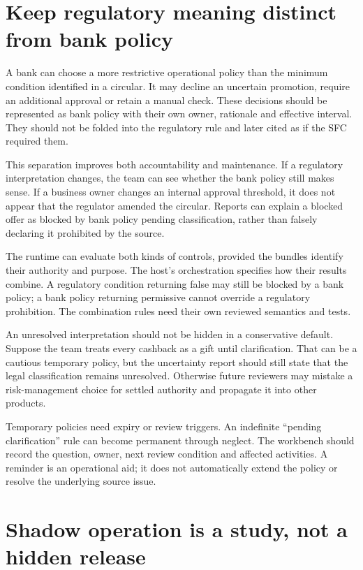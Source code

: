 \documentclass[12pt,a4paper,oneside,openany]{book}
\begin{document}
\section{Keep regulatory meaning distinct from bank policy}

A bank can choose a more restrictive operational policy than the minimum condition
identified in a circular. It may decline an uncertain promotion, require an
additional approval or retain a manual check. These decisions should be represented
as bank policy with their own owner, rationale and effective interval. They should
not be folded into the regulatory rule and later cited as if the SFC required them.

This separation improves both accountability and maintenance. If a regulatory
interpretation changes, the team can see whether the bank policy still makes sense.
If a business owner changes an internal approval threshold, it does not appear
that the regulator amended the circular. Reports can explain a blocked offer as
blocked by bank policy pending classification, rather than falsely declaring it
prohibited by the source.

The runtime can evaluate both kinds of controls, provided the bundles identify
their authority and purpose. The host's orchestration specifies how their results
combine. A regulatory condition returning false may still be blocked by a bank
policy; a bank policy returning permissive cannot override a regulatory
prohibition. The combination rules need their own reviewed semantics and tests.

An unresolved interpretation should not be hidden in a conservative default.
Suppose the team treats every cashback as a gift until clarification. That can be
a cautious temporary policy, but the uncertainty report should still state that
the legal classification remains unresolved. Otherwise future reviewers may
mistake a risk-management choice for settled authority and propagate it into
other products.

Temporary policies need expiry or review triggers. An indefinite ``pending
clarification'' rule can become permanent through neglect. The workbench should
record the question, owner, next review condition and affected activities. A
reminder is an operational aid; it does not automatically extend the policy or
resolve the underlying source issue.

\section{Shadow operation is a study, not a hidden release}
\end{document}
